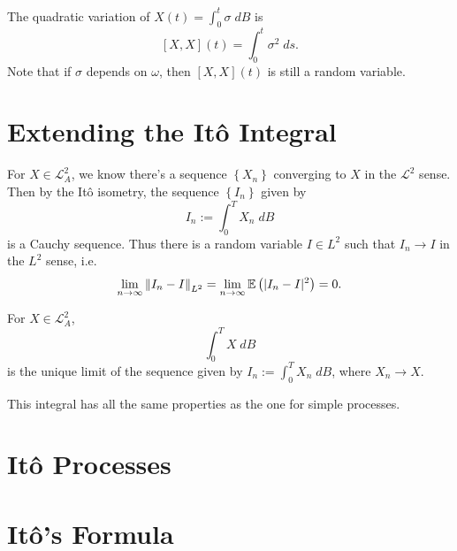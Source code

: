 \documentclass[twoside,10pt]{report}
\begin{document}

\begin{prop}
The quadratic variation of $X(t) = \int_{0}^{t} \sigma\;dB$ is
\[
[X,X](t) = \int_{0}^{t} \sigma^{2}\;ds.
\] 
Note that if $\sigma$ depends on $\omega$, then $[X,X](t)$ is still a random variable.
\end{prop}

\section{Extending the It\^o Integral}

For $X \in \mathcal{L}_{A}^2$, we know there's a sequence $ \left\{ X_{n} \right\}$ converging to $X$ in the $\mathcal{L}^2$ sense. Then by the It\^o isometry, the sequence $\left\{ I_{n} \right\}$ given by
\[
I_{n} := \int_{0}^{T} X_{n}\;dB
\] is a Cauchy sequence. Thus there is a random variable $I \in L^2$ such that $I_{n}\to I$ in the $L^2$ sense, i.e.
\[
\lim_{n \to \infty} {\Vert{I_{n}-I}\Vert}_{L^2} = \lim_{n \to \infty} \mathbb{E} \left(  |I_{n}-I|^2  \right) = 0.
\] 
\begin{defn}[]
For $X \in \mathcal{L}_{A}^2$,
\[
\int_{0}^{T} X\;dB
\] is the unique limit of the sequence given by $I_{n} := \int_{0}^{T} X_{n}\;dB$, where $X_{n} \to X$.
\end{defn}

This integral has all the same properties as the one for simple processes.

\section{It\^o Processes}


\section{It\^o's Formula}

\end{document}

